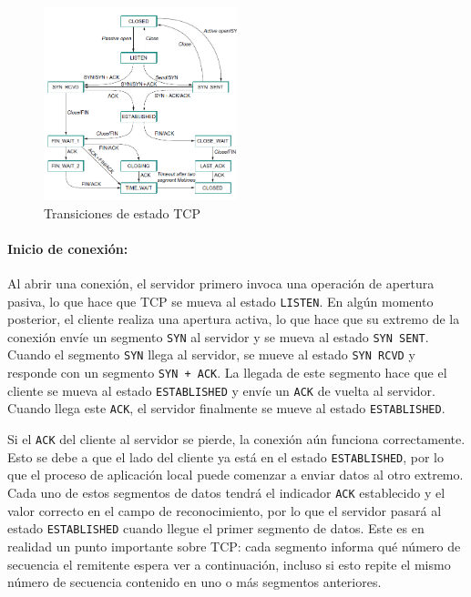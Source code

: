 \begin{figure}[H]
	\centering
	\includegraphics[width=0.5\textwidth
]{images/tcp-state-transitions.png}
	\caption[Transiciones de estado TCP]{Transiciones de estado TCP}
	\label{fig:tcp-state-transitions}
\end{figure}

\paragraph{Inicio de conexión:}Al abrir una conexión, el servidor primero invoca una operación de apertura pasiva, lo que hace que TCP se mueva al estado \texttt{LISTEN}. En algún momento posterior, el cliente realiza una apertura activa, lo que hace que su extremo de la conexión envíe un segmento \texttt{SYN} al servidor y se mueva al estado \texttt{SYN SENT}. Cuando el segmento \texttt{SYN} llega al servidor, se mueve al estado \texttt{SYN RCVD} y responde con un segmento \texttt{SYN + ACK}. La llegada de este segmento hace que el cliente se mueva al estado \texttt{ESTABLISHED} y envíe un \texttt{ACK} de vuelta al servidor. Cuando llega este \texttt{ACK}, el servidor finalmente se mueve al estado \texttt{ESTABLISHED}.

Si el \texttt{ACK} del cliente al servidor se pierde, la conexión aún funciona correctamente. Esto se debe a que el lado del cliente ya está en el estado \texttt{ESTABLISHED}, por lo que el proceso de aplicación local puede comenzar a enviar datos al otro extremo. Cada uno de estos segmentos de datos tendrá el indicador \texttt{ACK} establecido y el valor correcto en el campo de reconocimiento, por lo que el servidor pasará al estado \texttt{ESTABLISHED} cuando llegue el primer segmento de datos. Este es en realidad un punto importante sobre TCP: cada segmento informa qué número de secuencia el remitente espera ver a continuación, incluso si esto repite el mismo número de secuencia contenido en uno o más segmentos anteriores.

